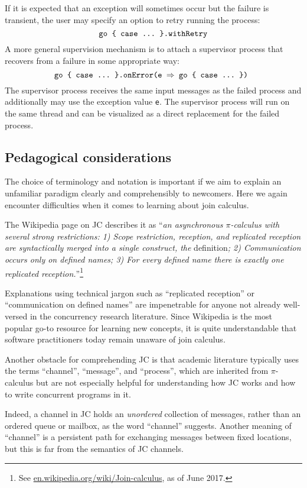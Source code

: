 \documentclass[sigplan,10pt,review,anonymous]{acmart}\settopmatter{printfolios=true}
\begin{document}
If it is expected that an exception will sometimes occur but the failure
is transient, the user may specify an option to retry running the
process:
\[
\text{\texttt{go \{ case ...~\}.withRetry}}
\]
A more general supervision mechanism is to attach a supervisor process
that recovers from a failure in some appropriate way:
\[
\text{\texttt{go \{ case ...~\}.onError(e \ensuremath{\Rightarrow} go \{ case ...~\}) }}
\]
The supervisor process receives the same input messages as the failed
process and additionally may use the exception value \texttt{e}. The
supervisor process will run on the same thread and can be visualized
as a direct replacement for the failed process.

\subsection{Pedagogical considerations}

The choice of terminology and notation is important if we aim to explain
an unfamiliar paradigm clearly and comprehensibly to newcomers. Here
we again encounter difficulties when it comes to learning about join
calculus. 

The Wikipedia page on JC describes it as ``\emph{an asynchronous
$\pi$-calculus with several strong restrictions: 1) Scope restriction,
reception, and replicated reception are syntactically merged into
a single construct, the }definition\emph{; 2) Communication occurs
only on defined names; 3) For every defined name there is exactly
one replicated reception.}''\footnote{ See \href{https://en.wikipedia.org/wiki/Join-calculus}{en.wikipedia.org/wiki/Join-calculus},
as of June 2017.}

Explanations using technical jargon such as ``replicated reception''
or ``communication on defined names'' are impenetrable for anyone
not already well-versed in the concurrency research literature. Since
Wikipedia is the most popular go-to resource for learning new concepts,
it is quite understandable that software practitioners today remain
unaware of join calculus.

Another obstacle for comprehending JC is that academic literature
typically uses the terms \textquotedblleft channel\textquotedblright ,
``message'', and ``process'', which are inherited from $\pi$-calculus
but are not especially helpful for understanding how JC works and
how to write concurrent programs in it.

Indeed, a channel in JC holds an \emph{unordered} collection of messages,
rather than an ordered queue or mailbox, as the word \textquotedblleft channel\textquotedblright{}
suggests. Another meaning of \textquotedblleft channel\textquotedblright{}
is a persistent path for exchanging messages between fixed locations,
but this is far from the semantics of JC channels.
\end{document}
